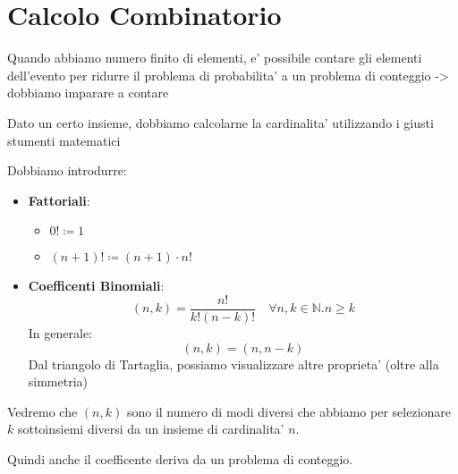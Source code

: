 \chapter{Calcolo Combinatorio}  

Quando abbiamo numero finito di elementi, e' possibile contare gli elementi dell'evento per ridurre il problema di probabilita' a un problema di conteggio -> dobbiamo imparare a contare

Dato un certo insieme, dobbiamo calcolarne la cardinalita' utilizzando i giusti stumenti matematici


Dobbiamo introdurre:
\begin{itemize}
\item \textbf{Fattoriali}:
  \begin{itemize}
  \item $ 0! \coloneq 1 $
  \item $ (n+1)! \coloneq (n+1) \cdot n! $
  \end{itemize}
  \item \textbf{Coefficenti Binomiali}:
    \[
      (n,k) = \frac{n!}{k! (n-k)!} \quad \forall n,k\in \mathbb{N}. n \geq k
    \]
    In generale:
    \[
      (n,k) = (n,n-k)
    \]
    Dal triangolo di Tartaglia, possiamo visualizzare altre proprieta' (oltre alla simmetria)
\end{itemize}

Vedremo che $ (n,k) $ sono il numero di modi diversi che abbiamo per selezionare $ k $ sottoinsiemi diversi da un insieme di cardinalita' $ n $.


Quindi anche il coefficente deriva da un problema di conteggio.

